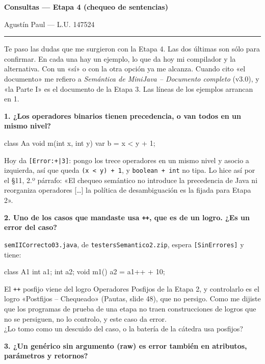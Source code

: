 \documentclass[12pt,a4paper]{article}
\newcommand{\cod}[1]{\texttt{#1}}
\newcommand{\pregunta}[1]{\par\medskip\needspace{4\baselineskip}\noindent\textbf{#1}\par\smallskip}
\begin{document}
\thispagestyle{fancy}
\raggedright

{\LARGE\bfseries Consultas --- Etapa 4 (chequeo de sentencias)\par}
\smallskip
{\color{tinta}Agustín Paul --- L.U. 147524\par}
\smallskip
{\color{tinta}\rule{\textwidth}{0.6pt}}
\medskip

Te paso las dudas que me surgieron con la Etapa 4. Las dos últimas son sólo para confirmar. En cada una hay un ejemplo, lo que da hoy mi
compilador y la alternativa. Con un «sí» o con la otra opción ya me alcanza. Cuando cito «el
documento» me refiero a \emph{Semántica de MiniJava -- Documento completo} (v3.0), y «la Parte I»
es el documento de la Etapa 3. Las líneas de los ejemplos arrancan en 1.

\pregunta{1. ¿Los operadores binarios tienen precedencia, o van todos en un mismo nivel?}

\begin{fuente}
class Aa {
    void m(int x, int y) {
        var b = x < y + 1;
    }
}
\end{fuente}

Hoy da \cod{[Error:+|3]}: pongo los trece operadores en un mismo nivel y asocio a izquierda, así
que queda \cod{(x < y) + 1}, y \cod{boolean + int} no tipa. Lo hice así por el §11, 2.º párrafo:
«El chequeo semántico no introduce la precedencia de Java ni reorganiza operadores [\dots] la
política de desambiguación es la fijada para Etapa 2».

\pregunta{2. Uno de los casos que mandaste usa \cod{++}, que es de un logro. ¿Es un error del caso?}

\cod{semIICorrecto03.java}, de \cod{testersSemantico2.zip}, espera \cod{[SinErrores]} y tiene:

\begin{fuente}
class A1 {
    int a1;
    int a2;
    void m1(){
        a2 = a1++ + 10;
    }
}
\end{fuente}

El \cod{++} posfijo viene del logro Operadores Posfijos de la Etapa 2, y controlarlo es el logro
«Postfijos -- Chequeado» (Pautas, slide 48), que no persigo. Como me dijiste que los programas de
prueba de una etapa no traen construcciones de logros que no se persiguen, no lo controlo, y este
caso da error.\\
¿Lo tomo como un descuido del caso, o la batería de la cátedra usa posfijos?

\pregunta{3. ¿Un genérico sin argumento (raw) es error también en atributos, parámetros y retornos?}
\end{document}
